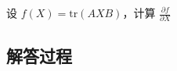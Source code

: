 \begin{example}[矩阵迹梯度]
    设 \(f(X) = \text{tr}(AXB)\)，计算 \(\frac{\partial f}{\partial X}\)
    \end{example}
    
    \subsection*{解答过程}
    